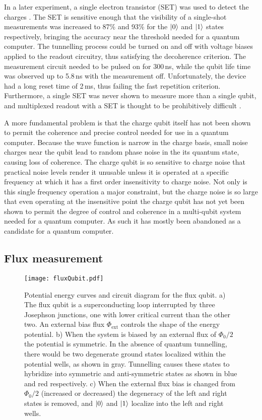 In a later experiment, a single electron transistor (SET) was used to detect the charges \cite{Astafiev:singleShot2004}.
The SET is sensitive enough that the visibility of a single-shot measurements was increased to 87\% and 93\% for the $|0\rangle$ and $|1\rangle$ states respectively, bringing the accuracy near the threshold needed for a quantum computer.
The tunnelling process could be turned on and off with voltage biases applied to the readout circuitry, thus satisfying the decoherence criterion.
The measurement circuit needed to be pulsed on for 300\,ns, while the qubit life time was observed up to 5.8\,ns with the measurement off.
Unfortunately, the device had a long reset time of 2\,\textrm{ms}, thus failing the fast repetition criterion.
Furthermore, a single SET was never shown to measure more than a single qubit, and multiplexed readout with a SET is thought to be prohibitively difficult \cite{Yamamoto:private}.

A more fundamental problem is that the charge qubit itself has not been shown to permit the coherence and precise control needed for use in a quantum computer.
Because the wave function is narrow in the charge basis, small noise charges near the qubit lead to random phase noise in the its quantum state, causing loss of coherence.
The charge qubit is so sensitive to charge noise that practical noise levels render it unusable unless it is operated at a specific frequency at which it has a first order insensitivity to charge noise.
Not only is this single frequency operation a major constraint, but the charge noise is so large that even operating at the insensitive point the charge qubit has not yet been shown to permit the degree of control and coherence in a multi-qubit system needed for a quantum computer.
As such it has mostly been abandoned as a candidate for a quantum computer.

\subsection{Flux measurement}

\begin{figure}
\begin{centering}
\texttt{[image: fluxQubit.pdf]} 
\par\end{centering}
\caption{Potential energy curves and circuit diagram for the flux qubit. a) The flux qubit is a superconducting loop interrupted by three Josephson junctions, one with lower critical current than the other two. An external bias flux $\Phi_{\textrm{ext}}$ controls the shape of the energy potential. b) When the system is biased by an external flux of $\Phi_0 / 2$ the potential is symmetric. In the absence of quantum tunnelling, there would be two degenerate ground states localized within the potential wells, as shown in gray. Tunnelling causes these states to hybridize into symmetric and anti-symmetric states as shown in blue and red respectively. c) When the external flux bias is changed from $\Phi_0 / 2$ (increased or decreased) the degeneracy of the left and right states is removed, and $|0\rangle$ and $|1\rangle$ localize into the left and right wells.}
\label{Fig:fluxQubit}
\end{figure}


